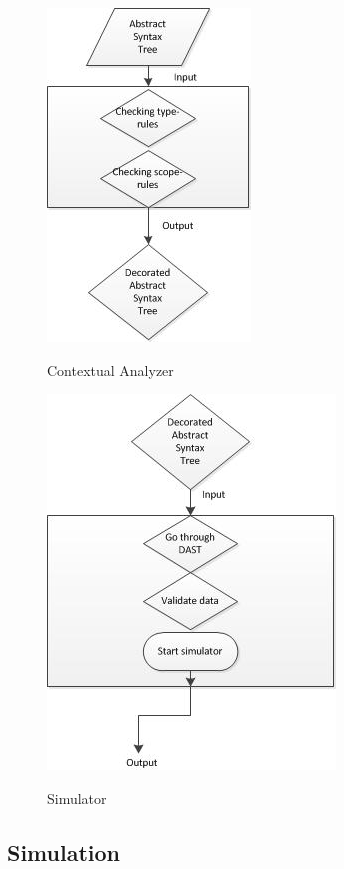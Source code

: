 \begin{figure}[H]
\centering
\includegraphics[scale=1]{rapport/6/figures/contextual_analyzer}
\label{fig:contextual_analyzer}
\caption{Contextual Analyzer}
\end{figure}

\begin{figure}[H]
\centering
\includegraphics[scale=1]{rapport/6/figures/simulator}
\label{fig:simulator}
\caption{Simulator}
\end{figure}


\subsection{Simulation}

